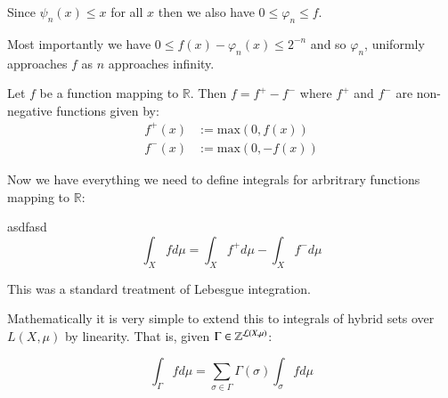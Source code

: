 Since $\psi_n(x) \leq x$ for all $x$ then we also have $0 \leq \varphi_n \leq f$.

Most importantly we have $0 \leq f(x) - \varphi_n(x) \leq 2^{-n}$ and so $\varphi_n$, uniformly approaches $f$ as $n$ approaches infinity. 

\begin{theorem}
Let $f$ be a function mapping to $\mathbb{R}$. Then $f = f^+ - f^-$ where $f^+$ and $f^-$ are non-negative functions given by:
\begin{align}
f^+(x) &:= \mathrm{max}( 0, f(x)) \\
f^-(x) &:= \mathrm{max}(0, -f(x)) 
\end{align}
\end{theorem}

Now we have everything we need to define integrals for arbritrary functions mapping to $\mathbb{R}$:

\begin{definition}
asdfasd
\begin{equation}
\int_X f d \mu = \int_X f^+ d \mu - \int_X f^- d \mu
\end{equation}
\end{definition}



This was a standard treatment of Lebesgue integration.

Mathematically it is very simple to extend this to integrals of hybrid sets over $L(X, \mu)$ by linearity.
That is, given $\Gamma \in \hsetover[\mathcal{L}(X,\mu)]$:

\begin{equation}
\int_\Gamma f d \mu = \sum_{\sigma \in \Gamma} \Gamma(\sigma) \int_\sigma f d\mu
\end{equation}
